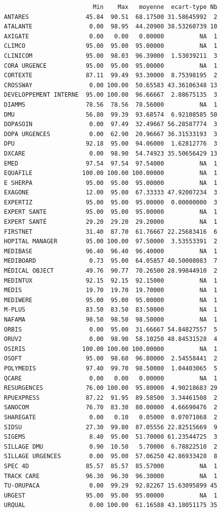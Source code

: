 \documentclass[]{article}
\begin{document}
\begin{verbatim}
                         Min    Max   moyenne  ecart-type Nb
ANTARES                45.84  90.51  68.17500 31.58645992  2
ATALANTE                0.00  98.95  44.20900 38.53260739 10
AXIGATE                 0.00   0.00   0.00000          NA  1
CLIMCO                 95.00  95.00  95.00000          NA  1
CLINICOM               95.00  98.03  96.39000  1.53039211  3
CORA URGENCE           95.00  95.00  95.00000          NA  1
CORTEXTE               87.11  99.49  93.30000  8.75398195  2
CROSSWAY                0.00 100.00  50.65583 43.36106348 13
DEVELOPPEMENT INTERNE  95.00 100.00  96.66667  2.88675135  3
DIAMMS                 78.56  78.56  78.56000          NA  1
DMU                    56.80  99.39  93.68574  6.92108585 50
DOPASOIN                0.00  97.49  32.49667 56.28587774  3
DOPA URGENCES           0.00  62.90  20.96667 36.31533193  3
DPU                    92.18  95.00  94.06000  1.62812776  3
DXCARE                  0.00  98.90  54.74923 35.50656429 13
EMED                   97.54  97.54  97.54000          NA  1
EQUAFILE              100.00 100.00 100.00000          NA  1
E SHERPA               95.00  95.00  95.00000          NA  1
EXAGONE                12.00  95.00  67.33333 47.92007234  3
EXPERTIZ               95.00  95.00  95.00000  0.00000000  3
EXPERT SANTE           95.00  95.00  95.00000          NA  1
EXPERT SANTÉ           29.20  29.20  29.20000          NA  1
FIRSTNET               31.40  87.70  61.76667 22.25683416  6
HOPITAL MANAGER        95.00 100.00  97.50000  3.53553391  2
MEDIBASE               96.40  96.40  96.40000          NA  1
MEDIBOARD               0.73  95.00  64.05857 40.50008083  7
MÉDICAL OBJECT         49.76  90.77  70.26500 28.99844910  2
MEDINTUX               92.15  92.15  92.15000          NA  1
MEDIS                  19.70  19.70  19.70000          NA  1
MEDIWERE               95.00  95.00  95.00000          NA  1
M-PLUS                 83.50  83.50  83.50000          NA  1
NAFAMA                 98.50  98.50  98.50000          NA  1
ORBIS                   0.00  95.00  31.66667 54.84827557  5
ORUV2                   0.00  98.90  58.10250 48.84531528  4
OSIRIS                100.00 100.00 100.00000          NA  1
OSOFT                  95.00  98.60  96.80000  2.54558441  2
POLYMEDIS              97.40  99.70  98.50000  1.04403065  5
QCARE                   0.00   0.00   0.00000          NA  1
RESURGENCES            76.00 100.00  95.80000  4.90218683 29
RPUEXPRESS             87.22  91.95  89.58500  3.34461508  2
SANOCOM                76.70  83.30  80.00000  4.66690476  2
SHAREGATE               0.00   0.10   0.05000  0.07071068  2
SIDSU                  27.30  99.80  87.05556 22.82515669  9
SIGEMS                  8.40  95.00  51.70000 61.23544725  3
SILLAGE DMU             0.90  10.50   5.70000  6.78822510  2
SILLAGE URGENCES        0.00  95.00  57.06250 42.86933428  8
SPEC 4D                85.57  85.57  85.57000          NA  1
TRACK CARE             96.30  96.30  96.30000          NA  1
TU-ORUPACA              0.00  99.29  92.82267 15.63095899 45
URGEST                 95.00  95.00  95.00000          NA  1
URQUAL                  0.00 100.00  61.16588 43.18051175 35
\end{verbatim}
\end{document}
